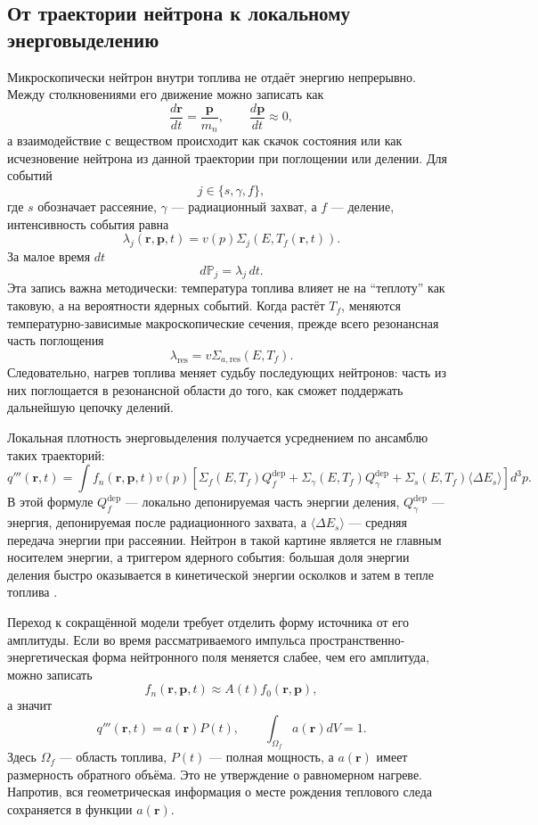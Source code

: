 \documentclass[12pt]{article}
\begin{document}
\subsection{От траектории нейтрона к локальному энерговыделению}

Микроскопически нейтрон внутри топлива не отдаёт энергию непрерывно. Между столкновениями его движение можно записать как
\[
\frac{d\mathbf r}{dt}=\frac{\mathbf p}{m_n},
\qquad
\frac{d\mathbf p}{dt}\approx0,
\]
а взаимодействие с веществом происходит как скачок состояния или как исчезновение нейтрона из данной траектории при поглощении или делении. Для событий
\[
j\in\{s,\gamma,f\},
\]
где \(s\) обозначает рассеяние, \(\gamma\) --- радиационный захват, а \(f\) --- деление, интенсивность события равна
\[
\lambda_j(\mathbf r,\mathbf p,t)
=
v(p)\Sigma_j(E,T_f(\mathbf r,t)).
\]
За малое время \(dt\)
\[
d\mathbb P_j=\lambda_j\,dt.
\]
Эта запись важна методически: температура топлива влияет не на ``теплоту'' как таковую, а на вероятности ядерных событий. Когда растёт \(T_f\), меняются температурно-зависимые макроскопические сечения, прежде всего резонансная часть поглощения
\[
\lambda_{\mathrm{res}}
=
v\Sigma_{a,\mathrm{res}}(E,T_f).
\]
Следовательно, нагрев топлива меняет судьбу последующих нейтронов: часть из них поглощается в резонансной области до того, как сможет поддержать дальнейшую цепочку делений.

Локальная плотность энерговыделения получается усреднением по ансамблю таких траекторий:
\[
q'''(\mathbf r,t)
=
\int
f_n(\mathbf r,\mathbf p,t)v(p)
\left[
\Sigma_f(E,T_f)Q_f^{\mathrm{dep}}
+
\Sigma_\gamma(E,T_f)Q_\gamma^{\mathrm{dep}}
+
\Sigma_s(E,T_f)\langle\Delta E_s\rangle
\right]d^3p.
\]
В этой формуле \(Q_f^{\mathrm{dep}}\) --- локально депонируемая часть энергии деления, \(Q_\gamma^{\mathrm{dep}}\) --- энергия, депонируемая после радиационного захвата, а \(\langle\Delta E_s\rangle\) --- средняя передача энергии при рассеянии. Нейтрон в такой картине является не главным носителем энергии, а триггером ядерного события: большая доля энергии деления быстро оказывается в кинетической энергии осколков и затем в тепле топлива \cite{DOEGeneralTechnicalBase2013}.

Переход к сокращённой модели требует отделить форму источника от его амплитуды. Если во время рассматриваемого импульса пространственно-энергетическая форма нейтронного поля меняется слабее, чем его амплитуда, можно записать
\[
f_n(\mathbf r,\mathbf p,t)\approx A(t)f_0(\mathbf r,\mathbf p),
\]
а значит
\[
q'''(\mathbf r,t)=a(\mathbf r)P(t),
\qquad
\int_{\Omega_f}a(\mathbf r)dV=1.
\]
Здесь \(\Omega_f\) --- область топлива, \(P(t)\) --- полная мощность, а \(a(\mathbf r)\) имеет размерность обратного объёма. Это не утверждение о равномерном нагреве. Напротив, вся геометрическая информация о месте рождения теплового следа сохраняется в функции \(a(\mathbf r)\).
\end{document}
